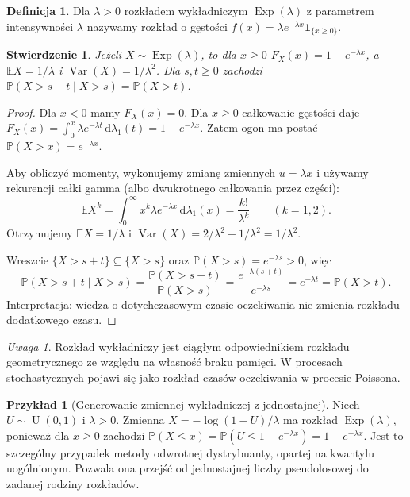 \documentclass[11pt,a4paper,oneside]{report}
\numberwithin{equation}{chapter}
\theoremstyle{plain}
\newtheorem{stwierdzenie}[twierdzenie]{Stwierdzenie}
\theoremstyle{definition}
\newtheorem{definicja}{Definicja}[chapter]
\newtheorem{przyklad}{Przykład}[chapter]
\theoremstyle{remark}
\newtheorem{uwaga}{Uwaga}[chapter]
\newcommand{\Prob}{\mathbb{P}}
\newcommand{\E}{\mathbb{E}}
\newcommand{\Var}{\operatorname{Var}}
\newcommand{\ind}[1]{\mathbf{1}_{#1}}
\newcommand{\dd}{\mathrm{d}}
\newcommand{\Unif}{\operatorname{U}}
\begin{document}
\begin{definicja}
Dla $\lambda>0$ rozkładem wykładniczym $\operatorname{Exp}(\lambda)$
z parametrem intensywności $\lambda$ nazywamy rozkład
o gęstości $f(x)=\lambda e^{-\lambda x}\ind{\{x\geq0\}}$.
\end{definicja}

\begin{stwierdzenie}
Jeżeli $X\sim\operatorname{Exp}(\lambda)$, to dla $x\geq0$
$F_X(x)=1-e^{-\lambda x}$, a
$\E X=1/\lambda$ i $\Var(X)=1/\lambda^2$.
Dla $s,t\geq0$ zachodzi
$\Prob(X>s+t\mid X>s)=\Prob(X>t)$.
\end{stwierdzenie}
\begin{proof}
Dla $x<0$ mamy $F_X(x)=0$. Dla $x\geq0$ całkowanie
gęstości daje
$F_X(x)=\int_0^x\lambda e^{-\lambda t}\,\dd\lambda_1(t)
=1-e^{-\lambda x}$.
Zatem ogon ma postać
$\Prob(X>x)=e^{-\lambda x}$.

Aby obliczyć momenty, wykonujemy zmianę zmiennych
$u=\lambda x$ i używamy rekurencji całki gamma
(albo dwukrotnego całkowania przez części):
\[
\E X^k=\int_0^\infty x^k\lambda e^{-\lambda x}
\,\dd\lambda_1(x)=\frac{k!}{\lambda^k}
\qquad(k=1,2).
\]
Otrzymujemy $\E X=1/\lambda$ i
$\Var(X)=2/\lambda^2-1/\lambda^2=1/\lambda^2$.

Wreszcie $\{X>s+t\}\subseteq\{X>s\}$ oraz
$\Prob(X>s)=e^{-\lambda s}>0$, więc
\[
\Prob(X>s+t\mid X>s)
=\frac{\Prob(X>s+t)}{\Prob(X>s)}
=\frac{e^{-\lambda(s+t)}}{e^{-\lambda s}}
=e^{-\lambda t}=\Prob(X>t).
\]
Interpretacja: wiedza o dotychczasowym czasie oczekiwania
nie zmienia rozkładu dodatkowego czasu.
\end{proof}

\begin{uwaga}
Rozkład wykładniczy jest ciągłym odpowiednikiem rozkładu
geometrycznego ze względu na własność braku pamięci.
W procesach stochastycznych pojawi się jako rozkład czasów
oczekiwania w procesie Poissona.
\end{uwaga}

\begin{przyklad}[Generowanie zmiennej wykładniczej z jednostajnej]
Niech $U\sim\Unif(0,1)$ i $\lambda>0$. Zmienna
$X=-\log(1-U)/\lambda$ ma rozkład $\operatorname{Exp}(\lambda)$,
ponieważ dla $x\geq0$ zachodzi
$\Prob(X\leq x)=\Prob(U\leq1-e^{-\lambda x})=1-e^{-\lambda x}$.
Jest to szczególny przypadek metody odwrotnej dystrybuanty,
opartej na kwantylu uogólnionym. Pozwala ona przejść od
jednostajnej liczby pseudolosowej do zadanej rodziny rozkładów.
\end{przyklad}
\end{document}
